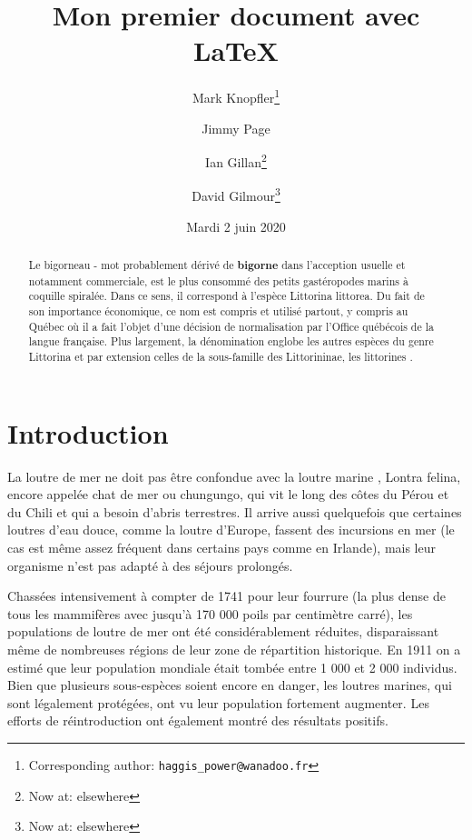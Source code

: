 \documentclass[a4paper, twoside]{article}
\title{Mon premier document avec \LaTeX} %
\author[,1]{Mark Knopfler\thanks{Corresponding author: \texttt{haggis\_power@wanadoo.fr}}}
\author[2,3]{Jimmy Page}
\author[,2]{Ian Gillan\thanks{Now at: elsewhere}}
\author[,3]{David Gilmour\thanks{Now at: elsewhere}}
\affil[1]{University of Glasgow, Scotland, United Kingdom}
\affil[2]{Imperial College London, London, England, United Kingdom}
\affil[3]{University of Cambridge, England, United Kingdom}
\date{Mardi 2 juin 2020}
\begin{document}
\maketitle %


\begin{abstract}
Le bigorneau - mot probablement dérivé de \textbf{bigorne} dans l'acception usuelle et notamment commerciale, est le plus consommé des petits gastéropodes marins à coquille spiralée. Dans ce sens, il correspond à l'espèce Littorina littorea. Du fait de son importance économique, ce nom est compris et utilisé partout, y compris au Québec où il a fait l'objet d'une décision de normalisation par l'Office québécois de la langue française. Plus largement, la dénomination englobe les autres espèces du genre Littorina et par extension celles de la sous-famille des Littorininae, les \og littorines \fg. 
\end{abstract}

\tableofcontents %

\section*{Introduction} %

La loutre de mer ne doit pas être confondue avec la \og loutre marine \fg, Lontra felina, encore appelée chat de mer ou chungungo, qui vit le long des côtes du Pérou et du Chili et qui a besoin d'abris terrestres. 
Il arrive aussi quelquefois que certaines loutres d'eau douce, comme la loutre d'Europe, fassent des incursions en mer (le cas est même assez fréquent dans certains pays comme en Irlande), mais leur organisme n'est pas adapté à des séjours prolongés. 

Chassées intensivement à compter de 1741 pour leur fourrure (la plus dense de tous les mammifères avec jusqu'à 170 000 poils par centimètre carré), les populations de loutre de mer ont été considérablement réduites, disparaissant même de nombreuses régions de leur zone de répartition historique. 
En 1911 on a estimé que leur population mondiale était tombée entre 1 000 et 2 000 individus. 
Bien que plusieurs sous-espèces soient encore en danger, les loutres marines, qui sont légalement protégées, ont vu leur population fortement augmenter. Les efforts de réintroduction ont également montré des résultats positifs.
\end{document}
